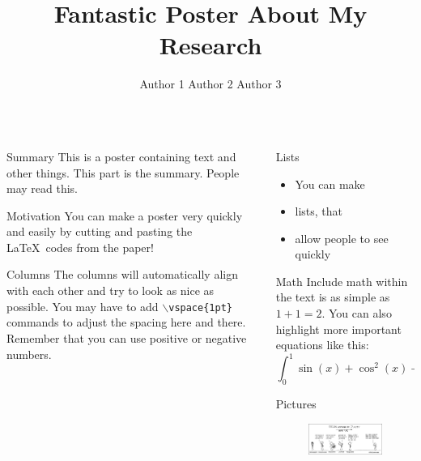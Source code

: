 \documentclass{beamer}
\title{Fantastic Poster About My Research}
\author{Author 1 \quad Author 2 \quad Author 3}
\institute{University of Illinois at Chicago}
\begin{document}
\begin{frame}{}
\begin{columns}[t]

\begin{column}{0.32\linewidth}

\begin{block}{Summary}
This is a poster containing text and other things. This part is the summary. People may read this.
\end{block}

\begin{block}{Motivation}
You can make a poster very quickly and easily by cutting and pasting the \LaTeX\ codes from the paper!
\end{block}

\begin{block}{Columns}
The columns will automatically align with each other and try to look as nice as possible.
You may have to add {\tt$\backslash$vspace\{1pt\}} commands to adjust the spacing here and
there.  Remember that you can use positive or negative numbers.
\end{block}

\end{column}%

\begin{column}{0.32\linewidth}

\begin{block}{Lists}
\begin{itemize}
\item You can make
\item lists, that
\item allow people to see quickly
\end{itemize}
\end{block}

\begin{block}{Math}
Include math within the text is as simple as $1+1=2$. You can also highlight more important equations like this:
\[
\int_0^1\sin(x)+\cos^2(x)+\alpha x\ dx
\]
\end{block}

\begin{block}{Pictures}
\begin{figure}[htb]
\centering
\includegraphics[width=.6\columnwidth]{science}
\end{figure}
\end{block}


\end{column}
\end{columns}
\end{frame}
\end{document}
